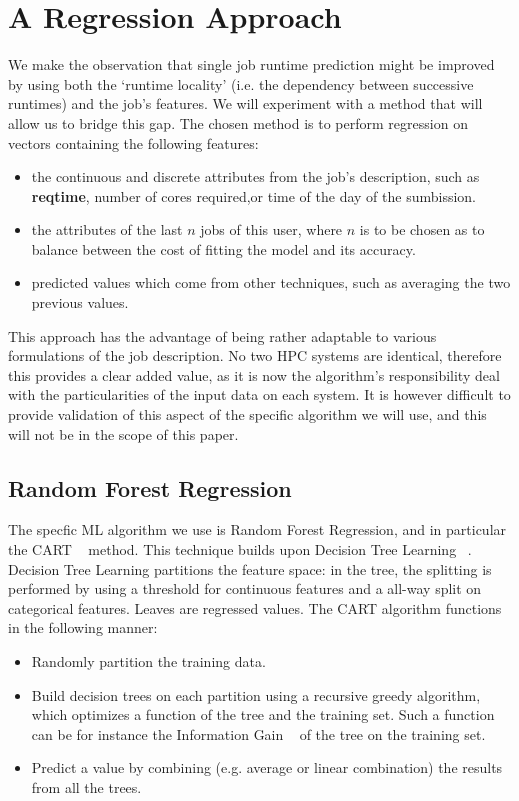 \documentclass{article}
\begin{document}
\section{A Regression Approach}
\label{sec:our_approach}
We make the observation that single job runtime prediction might be improved by using both the `runtime locality' (i.e. the dependency between successive runtimes) and the job's features. We will experiment with a method that will allow us to bridge this gap.
The chosen method is to perform regression on vectors containing the following features:
\begin{itemize}
  \item the continuous and discrete attributes from the job's description, such as \textbf{reqtime}, number of cores required,or time of the day of the sumbission.
  \item the attributes of the last $n$ jobs of this user, where $n$ is to be chosen as to balance between the cost of fitting the model and its accuracy.
  \item predicted values which come from other techniques, such as averaging the two previous values.
\end{itemize}
This approach has the advantage of being rather adaptable to various formulations of the job description.
No two HPC systems are identical, therefore this provides a clear added value, as it is now the algorithm's responsibility deal with the particularities of the input data on each system.
It is however difficult to provide validation of this aspect of the specific algorithm we will use, and this will not be in the scope of this paper.

\subsection{Random Forest Regression}
\label{sub:random_forests}
The specfic ML algorithm we use is Random Forest Regression, and in particular the CART ~\cite{randomforest} method. This technique builds upon Decision Tree Learning ~\cite{decisiontree}.
Decision Tree Learning partitions the feature space: in the tree, the splitting is performed by using a threshold for continuous features and a all-way split on categorical features. Leaves are regressed values.
The CART algorithm functions in the following manner:
\begin{itemize}
  \item Randomly partition the training data.
  \item Build decision trees on each partition using a recursive greedy algorithm, which optimizes a function of the tree and the training set. Such a function can be for instance the Information Gain ~\cite{kullback} of the tree on the training set.
  \item Predict a value by combining (e.g. average or linear combination) the results from all the trees.
\end{itemize}
\end{document}
